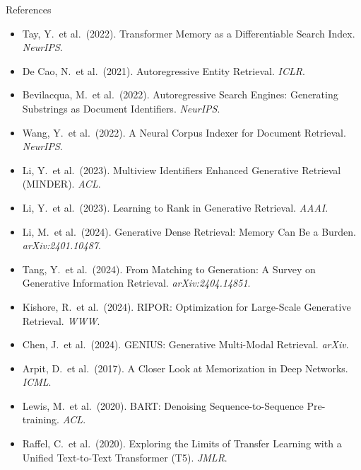 \documentclass[aspectratio=169,11pt]{beamer}
\begin{document}
\begin{frame}[allowframebreaks]{References}
\footnotesize
\begin{itemize}
    \item Tay, Y.\ et al.\ (2022). Transformer Memory as a Differentiable Search Index. \textit{NeurIPS}.
    \item De Cao, N.\ et al.\ (2021). Autoregressive Entity Retrieval. \textit{ICLR}.
    \item Bevilacqua, M.\ et al.\ (2022). Autoregressive Search Engines: Generating Substrings as Document Identifiers. \textit{NeurIPS}.
    \item Wang, Y.\ et al.\ (2022). A Neural Corpus Indexer for Document Retrieval. \textit{NeurIPS}.
    \item Li, Y.\ et al.\ (2023). Multiview Identifiers Enhanced Generative Retrieval (MINDER). \textit{ACL}.
    \item Li, Y.\ et al.\ (2023). Learning to Rank in Generative Retrieval. \textit{AAAI}.
    \item Li, M.\ et al.\ (2024). Generative Dense Retrieval: Memory Can Be a Burden. \textit{arXiv:2401.10487}.
    \item Tang, Y.\ et al.\ (2024). From Matching to Generation: A Survey on Generative Information Retrieval. \textit{arXiv:2404.14851}.
    \item Kishore, R.\ et al.\ (2024). RIPOR: Optimization for Large-Scale Generative Retrieval. \textit{WWW}.
    \item Chen, J.\ et al.\ (2024). GENIUS: Generative Multi-Modal Retrieval. \textit{arXiv}.
    \item Arpit, D.\ et al.\ (2017). A Closer Look at Memorization in Deep Networks. \textit{ICML}.
    \item Lewis, M.\ et al.\ (2020). BART: Denoising Sequence-to-Sequence Pre-training. \textit{ACL}.
    \item Raffel, C.\ et al.\ (2020). Exploring the Limits of Transfer Learning with a Unified Text-to-Text Transformer (T5). \textit{JMLR}.
\end{itemize}
\end{frame}
\end{document}
